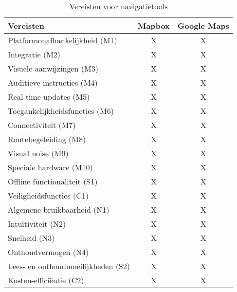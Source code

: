 \begin{table}[ht]
    \centering
    \begin{tabular}{|l|c|c|} \hline
        \textbf{Vereisten} & \textbf{Mapbox} & \textbf{Google Maps} \\ \hline
        Platformonafhankelijkheid (M1) & X & X \\
        Integratie (M2) & X & X \\
        Visuele aanwijzingen (M3) & X & X \\
        Auditieve instructies (M4) & X & X \\
        Real-time updates (M5) & X & X \\
        Toegankelijkheidsfuncties (M6) & X & X \\
        Connectiviteit (M7) & X & X \\
        Routebegeleiding (M8) & X & X \\
        Visual noise (M9) & X & X \\
        Speciale hardware (M10) & X & X \\
        Offline functionaliteit (S1) & X & X \\
        Veiligheidsfuncties (C1) & X & X \\
        Algemene bruikbaarheid (N1) & X & X \\
        Intuïtiviteit (N2) & X & X \\
        Snelheid (N3) & X & X \\
        Onthoudvermogen (N4) & X & X \\
        Lees- en onthoudmoeilijkheden (S2) & X & X \\
        Kosten-efficiëntie (C2) & X & X \\ \hline
    \end{tabular}
    \caption{Vereisten voor navigatietools}
    \label{tab:vereisten voor navigatietools}
\end{table}